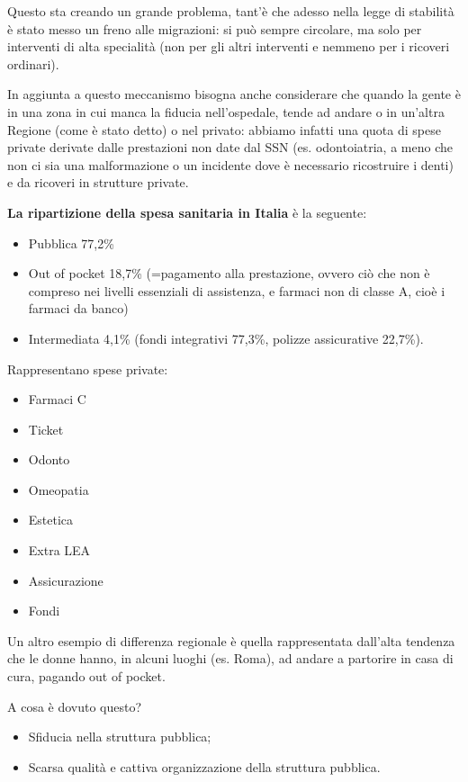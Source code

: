 Questo sta creando un grande problema, tant'è che adesso nella legge di stabilità è stato messo un freno alle migrazioni: si può sempre circolare, ma solo per interventi di alta specialità (non per gli altri interventi e nemmeno per i ricoveri ordinari).

In aggiunta a questo meccanismo bisogna anche considerare che quando la gente è in una zona in cui manca la fiducia nell'ospedale, tende ad andare o in un'altra Regione (come è stato detto) o nel privato: abbiamo infatti una quota di spese private derivate dalle prestazioni non date dal SSN (es. odontoiatria, a meno che non ci sia una malformazione o un incidente dove è necessario ricostruire i denti) e da ricoveri in strutture private.

\textbf{La ripartizione della spesa sanitaria in Italia} è la seguente:

\begin{itemize}
\item
  Pubblica 77,2\%
\item
  Out of pocket 18,7\% (=pagamento alla prestazione, ovvero ciò che non
  è compreso nei livelli essenziali di assistenza, e farmaci non di
  classe A, cioè i farmaci da banco)
\item
  Intermediata 4,1\% (fondi integrativi 77,3\%, polizze assicurative
  22,7\%).
\end{itemize}

Rappresentano spese private:

\begin{itemize}
\item Farmaci C
\item Ticket
\item Odonto
\item Omeopatia
\item Estetica
\item Extra LEA
\item Assicurazione
\item Fondi
\end{itemize}

Un altro esempio di differenza regionale è quella rappresentata
dall'alta tendenza che le donne hanno, in alcuni luoghi (es. Roma), ad andare a partorire in casa di cura, pagando out of pocket.

A cosa è dovuto questo?
\begin{itemize}
\item Sfiducia nella struttura pubblica;
\item Scarsa qualità e cattiva organizzazione della struttura pubblica.
\end{itemize}

